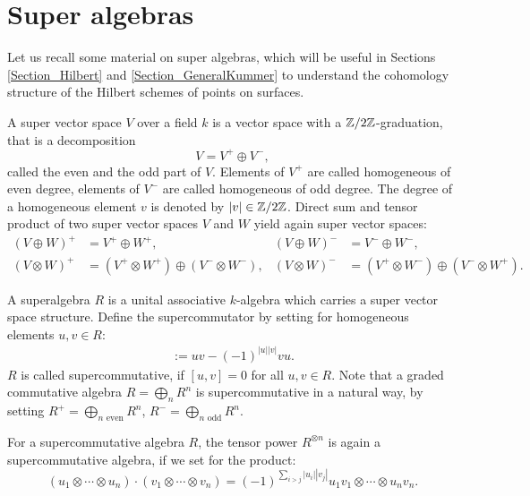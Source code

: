 \section{Super algebras} \label{SuperSection}
Let us recall some material on super algebras, which will be useful in Sections \ref{Section_Hilbert} and \ref{Section_GeneralKummer} to understand the cohomology structure of the Hilbert schemes of points on surfaces.
\begin{definition}
 A super vector space $V$ over a field $k$ is a vector space with a $\mathbb{Z}/2\mathbb{Z}$-graduation, that is a decomposition
$$
 V = V^{+} \oplus V^{-},
$$
called the even and the odd part of $V$. Elements of $V^{+}$ are called homogeneous of even degree, elements of $V^{-}$ are called homogeneous of odd degree.
The degree of a homogeneous element $v$ is denoted by $|v|\in \mathbb{Z}/2\mathbb{Z}$.
Direct sum and tensor product of two super vector spaces $V$ and $W$ yield again super vector spaces:
\begin{align*}
 (V\oplus W)^{+} &= V^{+}\oplus W^{+}, & (V\oplus W)^{-} &= V^{-}\oplus W^{-}, \\
 (V\otimes W)^{+} &= (V^{+}\otimes W^{+})\oplus (V^{-}\otimes W^{-}), & (V\otimes W)^{-} &=(V^{+}\otimes W^{-})\oplus (V^{-}\otimes W^{+}).
\end{align*}
\end{definition}
\begin{definition}
A superalgebra $R$ is a unital associative $k$-algebra which carries a super vector space structure. Define the supercommutator by setting for homogeneous elements $u,v \in R$:
\begin{align*}
[u,v] := uv - (-1)^{|u||v|} v u.
\end{align*}
$R$ is called supercommutative, if $[u,v]=0$ for all $u,v\in R$. Note that a graded commutative algebra $R = \bigoplus\limits_n R^n$ is supercommutative in a natural way, by setting $R^{+}=\bigoplus\limits_{n\text{ even}} R^n$, $R^{-}=\bigoplus\limits_{n\text{ odd}} R^n$.

For a supercommutative algebra $R$, the tensor power $R^{\otimes n}$ is again a supercommutative algebra, if we set for the product:
$$
(u_1\otimes\cdots\otimes u_n)\cdot(v_1\otimes\cdots\otimes v_n) 
=  (-1)^{\sum\limits_{i>j}|u_i||v_j|} u_1v_1\otimes\cdots\otimes u_nv_n.
$$
\end{definition}
